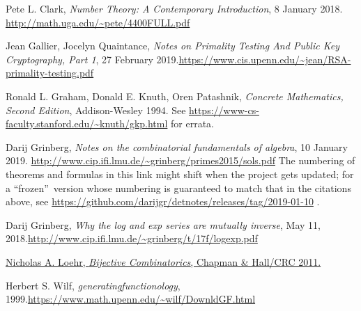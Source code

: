 \documentclass[paper=a4, fontsize=12pt]{scrartcl}%
\theoremstyle{plainsl}
\theoremstyle{definition}
\theoremstyle{remark}
\begin{document}
\begin{thebibliography}{99999999}                                                                                         %


Pete L. Clark, \textit{Number Theory: A Contemporary
Introduction}, 8 January 2018. \newline\url{http://math.uga.edu/~pete/4400FULL.pdf}

Jean Gallier, Jocelyn Quaintance, \textit{Notes
on Primality Testing And Public Key Cryptography, Part 1}, 27 February
2019.\newline\url{https://www.cis.upenn.edu/~jean/RSA-primality-testing.pdf}

Ronald L. Graham, Donald E. Knuth, Oren Patashnik,
\textit{Concrete Mathematics, Second Edition}, Addison-Wesley 1994.\newline
See \url{https://www-cs-faculty.stanford.edu/~knuth/gkp.html} for errata.

Darij Grinberg, \textit{Notes on the combinatorial
fundamentals of algebra}, 10 January 2019.\newline%
\url{http://www.cip.ifi.lmu.de/~grinberg/primes2015/sols.pdf} \newline The
numbering of theorems and formulas in this link might shift when the project
gets updated; for a \textquotedblleft frozen\textquotedblright\ version whose
numbering is guaranteed to match that in the citations above, see
\url{https://github.com/darijgr/detnotes/releases/tag/2019-01-10} .

Darij Grinberg, \textit{Why the log and exp series
are mutually inverse}, May 11, 2018.\newline\url{http://www.cip.ifi.lmu.de/~grinberg/t/17f/logexp.pdf}

%
\href{http://www.math.vt.edu/people/nloehr/bijbook.html}{Nicholas A. Loehr,
\textit{Bijective Combinatorics}, Chapman \& Hall/CRC 2011.}

Herbert S. Wilf, \textit{generatingfunctionology},
1999.\newline\url{https://www.math.upenn.edu/~wilf/DownldGF.html}
\end{thebibliography}
\end{document}
